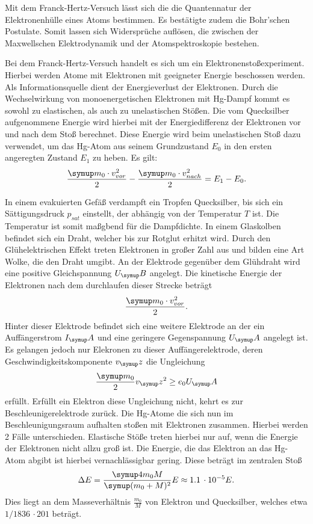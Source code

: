 Mit dem Franck-Hertz-Versuch lässt sich die die Quantennatur der Elektronenhülle
eines Atoms bestimmen. Es bestätigte zudem die
Bohr'schen Postulate. Somit lassen sich Widersprüche auflösen, die zwischen
der Maxwellschen Elektrodynamik und der Atomspektroskopie bestehen.

Bei dem Franck-Hertz-Versuch handelt es sich um ein Elektronenstoßexperiment.
Hierbei werden Atome mit Elektronen mit geeigneter Energie beschossen werden.
Als Informationsquelle dient der Energieverlust der Elektronen. Durch die Wechselwirkung
von monoenergetischen Elektronen mit Hg-Dampf kommt es sowohl zu elastischen, als
auch zu unelastischen Stößen. Die vom
Quecksilber aufgenommene Energie wird hierbei mit der Energiedifferenz der
Elektronen vor und nach dem Stoß berechnet. Diese Energie wird beim unelastischen
Stoß dazu verwendet, um das Hg-Atom aus seinem Grundzustand $E_0$ in den ersten angeregten
Zustand $E_1$ zu heben. Es gilt:
\begin{equation}
  \frac{\su{m_0\cdot v_{vor}^2}}{2}-\frac{\su{m_0\cdot v_{nach}^2}}{2} = E_1-E_0.
\end{equation}

In einem evakuierten Gefäß verdampft ein Tropfen Quecksilber, bis sich ein
Sättigungsdruck $p_{sat}$ einstellt, der abhängig von der Temperatur $T$ ist. Die
Temperatur ist somit maßgbend für die Dampfdichte.
In einem Glaskolben befindet sich ein Draht, welcher bis zur Rotglut erhitzt
wird. Durch den Glühelektrischen Effekt treten Elektronen in großer Zahl aus und
bilden eine Art Wolke, die den Draht umgibt. An der Elektrode gegenüber dem Glühdraht wird
eine positive Gleichspannung $U_\su{B}$ angelegt. Die kinetische Energie der
Elektronen nach dem durchlaufen dieser Strecke beträgt
\begin{equation}
  \frac{\su{m_0\cdot v_{vor}^2}}{2}.
  \label{Ekin}
\end{equation}
Hinter dieser Elektrode befindet sich eine weitere Elektrode an der ein
Auffängerstrom $I_\su{A}$ und eine geringere Gegenspannung $U_\su{A}$ angelegt
ist. Es gelangen jedoch nur Elekronen zu dieser Auffängerelektrode, deren
Geschwindigkeitskomponente $v_\su{z}$ die Ungleichung
\begin{equation}
  \frac{\su{m_0}}{2}v_\su{z}^2 \geq e_0U_\su{A}
\end{equation}
erfüllt. Erfüllt ein Elektron diese Ungleichung nicht, kehrt es zur
Beschleunigerelektrode zurück. Die Hg-Atome die sich nun im Beschleunigungsraum
aufhalten stoßen mit Elektronen zusammen. Hierbei werden 2 Fälle unterschieden.
Elastische Stöße treten hierbei nur auf, wenn die Energie der Elektronen
nicht allzu groß ist. Die
Energie, die das Elektron an das Hg-Atom abgibt ist hierbei vernachlässigbar
gering. Diese beträgt im zentralen Stoß
\begin{equation}
  \Delta E = \frac{\su{4m_0M}}{\su{(m_0+M)^2}}E\approx 1.1\,\cdot10^{-5}E.
\end{equation}
Dies liegt an dem Masseverhältnis $\frac{m_0}{M}$ von Elektron und Quecksilber,
welches etwa $1/1836\,\cdot201$ \cite{601} beträgt.

